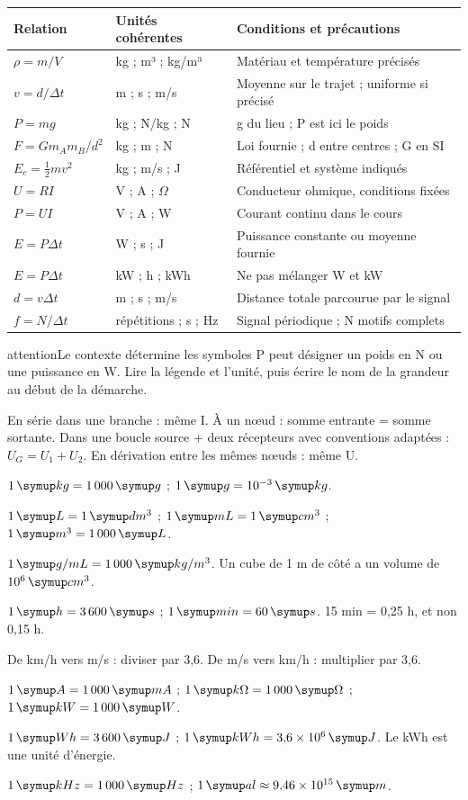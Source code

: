 \begin{tabularx}{\linewidth}{@{}p{37mm}p{37mm}Y@{}}\toprule
Relation & Unités cohérentes & Conditions et précautions\\\midrule
$\rho=m/V$ & kg ; m³ ; kg/m³ & Matériau et température précisés\\
$v=d/\Delta t$ & m ; s ; m/s & Moyenne sur le trajet ; uniforme si précisé\\
$P=mg$ & kg ; N/kg ; N & g du lieu ; P est ici le poids\\
$F=Gm_Am_B/d^2$ & kg ; m ; N & Loi fournie ; d entre centres ; G en SI\\
$E_c=\tfrac12mv^2$ & kg ; m/s ; J & Référentiel et système indiqués\\
$U=RI$ & V ; A ; $\Omega$ & Conducteur ohmique, conditions fixées\\
$P=UI$ & V ; A ; W & Courant continu dans le cours\\
$E=P\Delta t$ & W ; s ; J & Puissance constante ou moyenne fournie\\
$E=P\Delta t$ & kW ; h ; kWh & Ne pas mélanger W et kW\\
$d=v\Delta t$ & m ; s ; m/s & Distance totale parcourue par le signal\\
$f=N/\Delta t$ & répétitions ; s ; Hz & Signal périodique ; N motifs complets\\\bottomrule
\end{tabularx}\endgroup
\begin{pcEncadre}{attention}{Le contexte détermine les symboles}
P peut désigner un poids en N ou une puissance en W. Lire la légende et l’unité, puis écrire le nom de la grandeur au début de la démarche.
\end{pcEncadre}
En série dans une branche : même I. À un nœud : somme entrante = somme sortante. Dans une boucle source + deux récepteurs avec conventions adaptées : $U_G=U_1+U_2$. En dérivation entre les mêmes nœuds : même U.
\label{conversions}
\begin{questions}
\item $1\unite{kg}=1\,000\unite g$ ; $1\unite g=10^{-3}\unite{kg}$.
\item $1\unite L=1\unite{dm^3}$ ; $1\unite{mL}=1\unite{cm^3}$ ; $1\unite{m^3}=1\,000\unite L$.
\item $1\unite{g/mL}=1\,000\unite{kg/m^3}$. Un cube de 1 m de côté a un volume de $10^6\unite{cm^3}$.
\item $1\unite h=3\,600\unite s$ ; $1\unite{min}=60\unite s$. 15 min = 0,25 h, et non 0,15 h.
\item De km/h vers m/s : diviser par 3,6. De m/s vers km/h : multiplier par 3,6.
\item $1\unite A=1\,000\unite{mA}$ ; $1\unite{k\Omega}=1\,000\unite\Omega$ ; $1\unite{kW}=1\,000\unite W$.
\item $1\unite{Wh}=3\,600\unite J$ ; $1\unite{kWh}=3{,}6\times10^6\unite J$. Le kWh est une unité d’énergie.
\item $1\unite{kHz}=1\,000\unite{Hz}$ ; $1\unite{al}\approx9{,}46\times10^{15}\unite m$.
\end{questions}

